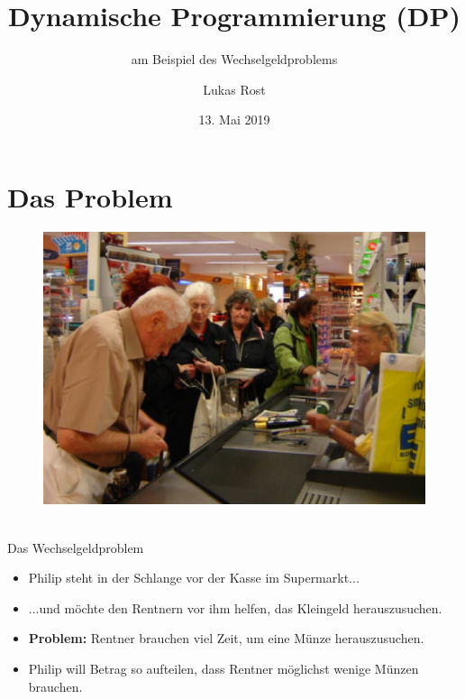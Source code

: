 \documentclass[hyphens,compress,fleqn]{beamer}
\begin{document}
	\title{Dynamische Programmierung (DP)}
	\subtitle{am Beispiel des Wechselgeldproblems}
	\author{Lukas Rost}
	\date{13. Mai 2019}
	
	\begin{frame}[plain]
	\titlepage
	\end{frame}
	
	\section{Das Problem}
	\begin{frame}
		\begin{figure}
			\includegraphics[width=\textwidth]{pics/warteschlange}
		\end{figure}
	\end{frame}

	\begin{frame}{{\footnotesize\insertsectionhead\\}Das Wechselgeldproblem}
		\begin{itemize}[<+->]
			\item Philip steht in der Schlange vor der Kasse im Supermarkt...
			\item ...und möchte den Rentnern vor ihm helfen, das Kleingeld herauszusuchen.
			\item \textbf{Problem:} Rentner brauchen viel Zeit, um eine Münze herauszusuchen.
			\item Philip will Betrag so aufteilen, dass Rentner möglichst wenige Münzen brauchen.
		\end{itemize}
	\end{frame}
\end{document}
